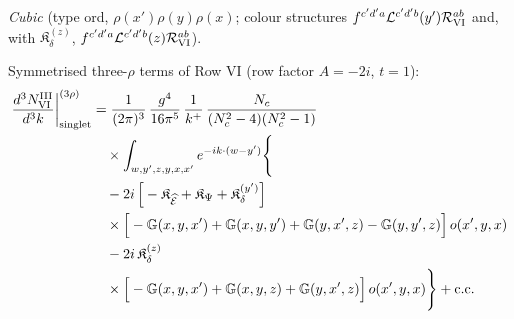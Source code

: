 \documentclass[9pt]{article}
\def\mf#1{\mathbb{#1}}
\numberwithin{equation}{section}
\begin{document}
{\emph{Cubic} (type ord, $\rho(x')\rho(y)\rho(x)$; colour structures $f^{c'd'a}\mathcal{L}^{c'd'b}(y')\mathcal{R}^{ab}_{\rm VI}$ and, with $\mathfrak{K}_{\delta}^{(z)}$, $f^{c'd'a}\mathcal{L}^{c'd'b}(z)\mathcal{R}^{ab}_{\rm VI}$).

 Symmetrised three-$\rho$ terms of Row VI (row factor $A=-2i$, $t=1$):
\begin{align}
\frac{d^{3}N^{\rm III}_{\rm VI}}{d^{3}k}\bigg|^{(3\rho)}_{\rm singlet}&=\frac{1}{(2\pi)^{3}}\,\frac{g^{4}}{16\pi^{5}}\,\frac{1}{k^{+}}\,\frac{N_{c}}{(N_{c}^{2}-4)(N_{c}^{2}-1)}\notag\\
&\quad\times\int_{w,y',z,y,x,x'}e^{-ik\cdot(w-y')}\Bigg\{\notag\\
&\quad-2i\,\Big[-\mathfrak{K}_{\widehat{\mathcal{E}}}+\mathfrak{K}_{\Psi}+\mathfrak{K}_{\delta}^{(y')}\Big]\notag\\
&\quad\times\Big[-\mf{G}(x,y,x')+\mf{G}(x,y,y')+\mf{G}(y,x',z)-\mf{G}(y,y',z)\Big]\,o(x',y,x)\notag\\
&\quad-2i\,\mathfrak{K}_{\delta}^{(z)}\notag\\
&\quad\times\Big[-\mf{G}(x,y,x')+\mf{G}(x,y,z)+\mf{G}(y,x',z)\Big]\,o(x',y,x)\Bigg\}+{\rm c.c.}\label{eq:s-o-III-VI}
\end{align}

}
\end{document}
